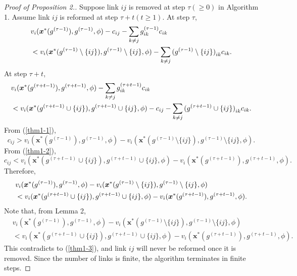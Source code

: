 \documentclass[12pt]{article}
\theoremstyle{definition}
\newcommand{\bm}[1]{\boldsymbol{#1}}
\begin{document}
\begin{proof}[Proof of Proposition 2.]
	Suppose link $ij$ is removed at step $\tau(\ge0)$ in Algorithm 1.
	Assume link $ij$ is reformed at step $\tau + t (t \ge 1)$.
	At step $\tau$,
	\begin{align}
		\label{thm1-1}
		& v_i(\bm{x}^*(g^{(\tau - 1)}), g^{(\tau - 1)}, \phi) - c_{ij} - \sum_{k \neq j} g_{ik}^{(\tau - 1)} c_{ik} \notag \\
			& < v_i(\bm{x}^*(g^{(\tau - 1)} \setminus \{ ij \}), g^{(\tau - 1)} \setminus \{ ij \}, \phi) - \sum_{k \neq j} {(g^{(\tau - 1)} \setminus \{ij\})}_{ik} c_{ik}.
	\end{align}
	At step $\tau + t$,
	\begin{align}
		\label{thm1-2}
		& v_i(\bm{x}^*(g^{(\tau + t-1)}), g^{(\tau + t-1)}, \phi) - \sum_{k \neq j} g_{ik}^{(\tau + t-1)} c_{ik} \notag \\
			& < v_i(\bm{x}^*(g^{(\tau + t-1)} \cup \{ ij \}), g^{(\tau + t-1)} \cup \{ ij \}, \phi) - c_{ij} - \sum_{k \neq j} {(g^{(\tau + t-1)} \cup \{ij\})}_{ik} c_{ik}.
	\end{align}
	From (\ref{thm1-1}),
	\[ c_{ij} > v_i(\bm{x}^*(g^{(\tau - 1)}), g^{(\tau - 1)}, \phi) - v_i(\bm{x}^*(g^{(\tau - 1)} \setminus \{ ij \}), g^{(\tau - 1)} \setminus \{ ij \}, \phi). \]
	From (\ref{thm1-2}),
	\[ c_{ij} < v_i(\bm{x}^*(g^{(\tau + t-1)} \cup \{ ij \}), g^{(\tau + t-1)} \cup \{ ij \}, \phi) - v_i(\bm{x}^*(g^{(\tau + t-1)}), g^{(\tau + t-1)}, \phi). \]
	Therefore,
	\begin{align}
		\label{thm1-3}
		& v_i(\bm{x}^*(g^{(\tau - 1)}), g^{(\tau - 1)}, \phi) - v_i(\bm{x}^*(g^{(\tau - 1)} \setminus \{ ij \}), g^{(\tau - 1)} \setminus \{ ij \}, \phi) \notag \\
			& < v_i(\bm{x}^*(g^{(\tau + t-1)} \cup \{ ij \}), g^{(\tau + t-1)} \cup \{ ij \}, \phi) - v_i(\bm{x}^*(g^{(\tau + t-1)}), g^{(\tau + t-1)}, \phi).
	\end{align}
	Note that, from Lemma 2,
	\begin{align*}
		& v_i(\bm{x}^*(g^{(\tau - 1)}), g^{(\tau - 1)}, \phi) - v_i(\bm{x}^*(g^{(\tau - 1)} \setminus \{ ij \}), g^{(\tau - 1)} \setminus \{ ij \}, \phi) \\
			& < v_i(\bm{x}^*(g^{(\tau + t-1)} \cup \{ ij \}), g^{(\tau + t-1)} \cup \{ ij \}, \phi) - v_i(\bm{x}^*(g^{(\tau + t-1)}), g^{(\tau + t-1)}, \phi).
	\end{align*}
	This contradicts to (\ref{thm1-3}), and link $ij$ will never be reformed once it is removed.
	Since the number of links is finite, the algorithm terminates in finite steps.
\end{proof}
\end{document}
